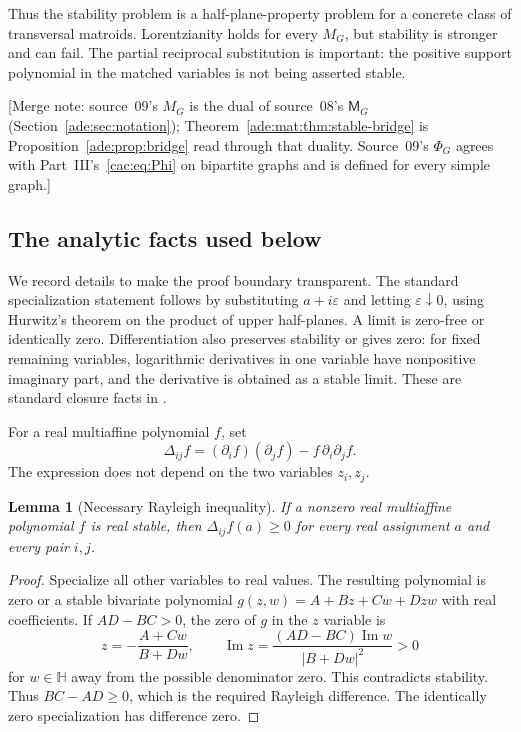 \documentclass[11pt]{article}
\numberwithin{equation}{section}
\newtheorem{lemma}[theorem]{Lemma}
\theoremstyle{definition}
\newcommand{\HH}{\mathbb H}
\newcommand{\del}{\Delta}
\newcommand{\im}{\operatorname{Im}}
\newcommand{\ep}{\varepsilon}
\begin{document}
Thus the stability problem is a half-plane-property problem for a concrete
class of transversal matroids. Lorentzianity holds for every $M_G$, but
stability is stronger and can fail. The partial reciprocal substitution is
important: the positive support polynomial in the matched variables is not
being asserted stable.

[Merge note: source~09's $M_G$ is the dual of source~08's $\mathsf M_G$
(Section~\ref{ade:sec:notation}); Theorem~\ref{ade:mat:thm:stable-bridge} is
Proposition~\ref{ade:prop:bridge} read through that duality. Source~09's
$\Phi_G$ agrees with Part~III's~\eqref{cac:eq:Phi} on bipartite graphs and is
defined for every simple graph.]

\subsection{The analytic facts used below}

We record details to make the proof boundary transparent.  The standard
specialization statement follows by substituting $a+i\ep$ and letting
$\ep\downarrow0$, using Hurwitz's theorem on the product of upper
half-planes.  A limit is zero-free or identically zero.  Differentiation
also preserves stability or gives zero: for fixed remaining variables,
logarithmic derivatives in one variable have nonpositive imaginary part,
and the derivative is obtained as a stable limit.  These are standard
closure facts in \cite{COSW,Branden}.

For a real multiaffine polynomial $f$, set
\begin{equation}
 \del_{ij}f=(\partial_i f)(\partial_j f)-f\,\partial_i\partial_j f.
 \label{ade:eq:Rayleigh}
\end{equation}
The expression does not depend on the two variables $z_i,z_j$.

\begin{lemma}[Necessary Rayleigh inequality]
\label{ade:lem:rayleigh}
If a nonzero real multiaffine polynomial $f$ is real stable, then
$\del_{ij}f(a)\ge0$ for every real assignment $a$ and every pair $i,j$.
\end{lemma}
\begin{proof}
Specialize all other variables to real values.  The resulting polynomial
is zero or a stable bivariate polynomial
$g(z,w)=A+Bz+Cw+Dzw$ with real coefficients.
If $AD-BC>0$, the zero of $g$ in the $z$ variable is
\[
 z=-\frac{A+Cw}{B+Dw},\qquad
 \im z=\frac{(AD-BC)\im w}{|B+Dw|^2}>0
\]
for $w\in\HH$ away from the possible denominator zero.  This contradicts
stability.  Thus $BC-AD\ge0$, which is the required Rayleigh difference.
The identically zero specialization has difference zero.
\end{proof}
\end{document}
